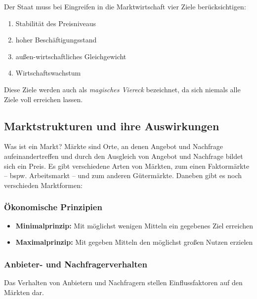 Der Staat muss bei Eingreifen in die Marktwirtschaft vier Ziele berücksichtigen:
	
\begin{enumerate}
	\item Stabilität des Preisniveaus
	\item hoher Beschäftigungsstand 
	\item außen-wirtschaftliches Gleichgewicht
	\item Wirtschaftswachstum
\end{enumerate}

Diese Ziele werden auch als {\it magisches Viereck} bezeichnet, da sich niemals alle Ziele voll erreichen lassen.


\subsection{Marktstrukturen und ihre Auswirkungen}

Was ist ein Markt? Märkte sind Orte, an denen Angebot und Nachfrage aufeinandertreffen und durch den Ausgleich von Angebot und Nachfrage bildet sich ein Preis. Es gibt verschiedene Arten von Märkten, zum einen Faktormärkte -- bspw. Arbeitsmarkt -- und zum anderen Gütermärkte. Daneben gibt es noch verschieden Marktformen:\\

\subsubsection{Ökonomische Prinzipien}

\begin{itemize}
	\item \textbf{Minimalprinzip:} Mit möglichst wenigen Mitteln ein gegebenes Ziel erreichen
	\item \textbf{Maximalprinzip:} Mit gegeben Mitteln den möglichst großen Nutzen erzielen
\end{itemize}

\subsubsection{Anbieter- und Nachfragerverhalten}
Das Verhalten von Anbietern und Nachfragern stellen Einflussfaktoren auf den Märkten dar.

